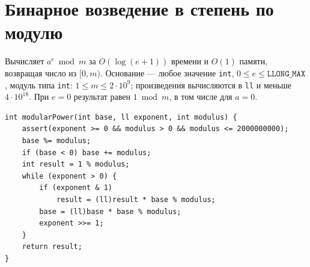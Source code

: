 \section{Бинарное возведение в степень по модулю}
Вычисляет $a^e\bmod m$ за $O(\log(e+1))$ времени и $O(1)$ памяти, возвращая число из $[0,m)$.
Основание --- любое значение \texttt{int}, $0\le e\le\texttt{LLONG\_MAX}$, модуль типа \texttt{int}: $1\le m\le2\cdot10^9$; произведения вычисляются в \texttt{ll} и меньше $4\cdot10^{18}$.
При $e=0$ результат равен $1\bmod m$, в том числе для $a=0$.
\begin{lstlisting}[name=math_power]
int modularPower(int base, ll exponent, int modulus) {
    assert(exponent >= 0 && modulus > 0 && modulus <= 2000000000);
    base %= modulus;
    if (base < 0) base += modulus;
    int result = 1 % modulus;
    while (exponent > 0) {
        if (exponent & 1)
            result = (ll)result * base % modulus;
        base = (ll)base * base % modulus;
        exponent >>= 1;
    }
    return result;
}
\end{lstlisting}
%


